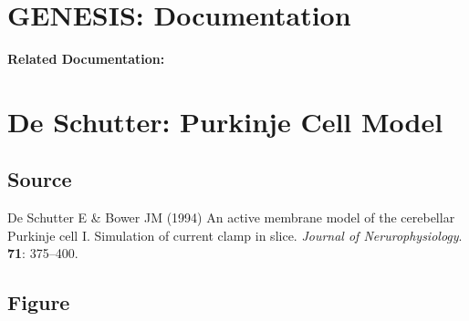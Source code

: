 \documentclass[12pt]{article}
\begin{document}
\section*{GENESIS: Documentation}

{\bf Related Documentation:}

\section*{De Schutter: Purkinje Cell Model}

\subsection*{Source}

De Schutter E \& Bower JM (1994) An active membrane model of the cerebellar Purkinje cell I. Simulation of current clamp in slice. {\it Journal of Nerurophysiology}. {\bf 71}: 375--400. \\

\subsection*{Figure}
\end{document}
